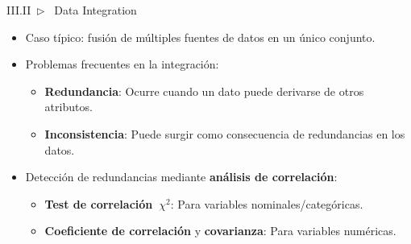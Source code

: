 \documentclass[xcolor=dvipsnames]{beamer}
\begin{document}
    \begin{frame}{III.II~$\rhd$~ Data Integration}
        \begin{itemize}
            \item Caso típico: fusión de múltiples fuentes de datos en un único conjunto.
            \vspace{4mm}%
            \item Problemas frecuentes en la integración:
            \begin{itemize}
                \item \textbf{Redundancia}: Ocurre cuando un dato puede derivarse de otros atributos.
                \item \textbf{Inconsistencia}: Puede surgir como consecuencia de redundancias en los datos.
            \end{itemize}
            \vspace{4mm}%
            \item Detección de redundancias mediante \textbf{análisis de correlación}:
            \begin{itemize}
                \item \textbf{Test de correlación~$\chi^{2}$}: Para variables nominales/categóricas.
                \item \textbf{Coeficiente de correlación} y \textbf{covarianza}: Para variables numéricas.
            \end{itemize}
        \end{itemize}
    \end{frame}
\end{document}
